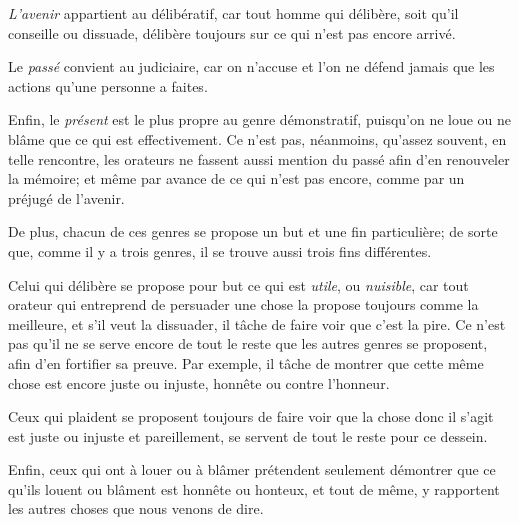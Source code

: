 \emph{L'avenir} appartient au délibératif, car tout homme qui délibère, soit qu'il conseille ou dissuade, délibère toujours
sur ce qui n'est pas encore arrivé. 

Le \emph{passé} convient au judiciaire, car on n'accuse et l'on ne défend jamais que les actions qu'une personne a faites. 

Enfin, le \emph{présent} est le plus propre au genre démonstratif, puisqu'on ne loue ou ne blâme que ce qui est effectivement.
Ce n'est pas, néanmoins, qu'assez souvent, en telle rencontre, les orateurs ne fassent aussi mention du passé afin d'en
renouveler la mémoire; et même par avance de ce qui n'est pas encore, comme par un préjugé de l'avenir. 

\bigbreak

De plus, chacun de ces genres se propose un but et une fin particulière; de sorte que, comme il y a trois genres, il se
trouve aussi trois fins différentes.

Celui qui délibère se propose pour but ce qui est \emph{utile}, ou \emph{nuisible}, car tout orateur qui entreprend de
persuader une chose la propose toujours comme la meilleure, et s'il veut la dissuader, il tâche de faire voir que c'est
la pire. Ce n'est pas qu'il ne se serve encore de tout le reste que les autres genres se proposent, afin d'en fortifier
sa preuve. Par exemple, il tâche de montrer que cette même chose est encore juste ou injuste, honnête ou contre l'honneur. 

Ceux qui plaident se proposent toujours de faire voir que la chose donc il s'agit est juste ou injuste et pareillement,
se servent de tout le reste pour ce dessein.

Enfin, ceux qui ont à louer ou à blâmer prétendent seulement démontrer que ce qu'ils louent ou blâment est honnête ou
honteux, et tout de même, y rapportent les autres choses que nous venons de dire.

